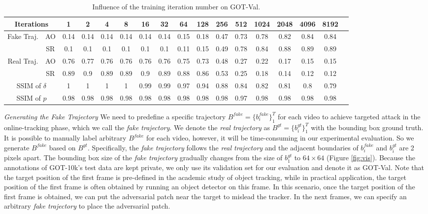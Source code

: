 \documentclass[journal]{IEEEtran}
\begin{document}
\begin{table}
  \centering
  \caption{Influence of the training iteration number on GOT-Val.}
  \begin{tabular}{cc|ccccccccccccccc} 
  \toprule
  \multicolumn{2}{c|}{Iterations}     & 1     & 2     & 4     & 8     & 16    & 32    & 64    & 128   & 256   & 512   & 1024  & 2048  & 4096  & 8192  \\ 
  \midrule
  \multirow{2}{*}{Fake Traj.} & AO    &  0.14 & 0.14 & 0.14 & 0.14 & 0.14 & 0.14 & 0.15 & 0.18 & 0.47 & 0.73 & 0.78 & 0.82 & 0.84 & 0.84  \\
                              & SR    &  0.1 & 0.1 & 0.1 & 0.1 & 0.1 & 0.1 & 0.11 & 0.15 & 0.49 & 0.78 & 0.84 & 0.88 & 0.89 & 0.89    \\ 
  \midrule
  \multirow{2}{*}{Real Traj.} & AO   & 0.76 & 0.77 & 0.76 & 0.76 & 0.76 & 0.76 & 0.75 & 0.73 & 0.48 & 0.27 & 0.22 & 0.17 & 0.15 & 0.15    \\
                              & SR   & 0.89 & 0.9 & 0.89 & 0.89 & 0.9 & 0.89 & 0.88 & 0.86 & 0.53 & 0.25 & 0.18 & 0.14 & 0.12 & 0.12    \\ 
  \midrule
  \multicolumn{2}{c|}{SSIM of $\delta$}&   1 & 1 & 1 & 1 & 0.99 & 0.99 & 0.97 & 0.94 & 0.88 & 0.84 & 0.82 & 0.81 & 0.8 & 0.79\\
  \midrule
  \multicolumn{2}{c|}{SSIM of $p$}      &  0.98 & 0.98 & 0.98 & 0.98 & 0.98 & 0.98 & 0.98 & 0.98 & 0.98 & 0.97 & 0.98 & 0.98 & 0.98 & 0.98\\
  \bottomrule
  \end{tabular}
  \label{tab:iter}
  \end{table}

\textit{Generating the Fake Trajectory} We need to predefine a specific trajectory $B^{fake}=\{b^{fake}_i\}_1^{T}$ for each video to achieve targeted attack in the online-tracking phase, which we call the \textit{fake trajectory}. We denote the \textit{real trajectory} as $B^{gt}=\{b^{gt}_i\}_1^T$ with the bounding box ground truth.
It is possible to manually label arbitrary $B^{fake}$ for each video, however, it will be time-consuming in our experimental evaluation. So we generate $B^{fake}$ based on $B^{gt}$. Specifically, the \textit{fake trajectory} follows the \textit{real trajectory} and the adjacent boundaries of $b^{fake}_i$ and $b^{gt}_i$ are 2 pixels apart.
The bounding box size of the \textit{fake trajectory} gradually changes from the size of $b^{gt}_1$ to $64\times 64$ (Figure \ref{fig:vis}). Because the annotations of GOT-10k's test data are kept private, we only use its validation set for our evaluation and denote it as GOT-Val. Note that the target position of the first frame is pre-defined in the academic study of object tracking, while in practical application, the target position of the first frame is often obtained by running an object detector on this frame. In this scenario, once the target position of the first frame is obtained, we can put the adversarial patch near the target to mislead the tracker. In the next frames, we can specify an arbitrary \textit{fake trajectory} to place the adversarial patch.
\end{document}
